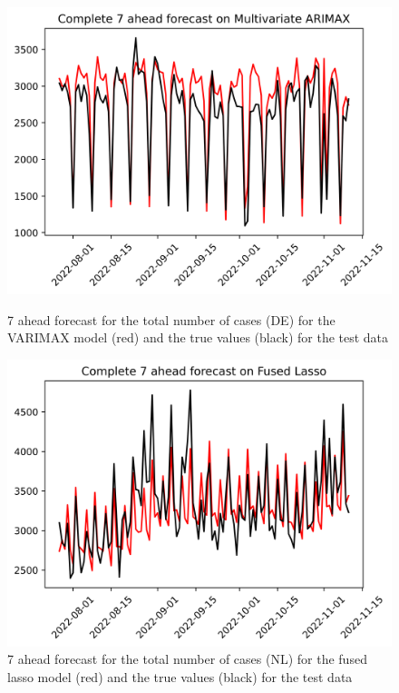 \begin{figure}

\begin{minipage}{.32\textwidth}
  \centering
  \includegraphics[width=\linewidth]{pics/7_ah/DE_Complete_7_ahead_Multivariate ARIMAX.png}
  \caption{7 ahead forecast for the total number of cases (DE) for the VARIMAX model (red) and the true values (black) for the test data}
  \label{fig:tot_cases_fc_7_VARIMAX_DE}
\end{minipage}
\begin{minipage}{.32\textwidth}
  \centering
  \includegraphics[width=\linewidth]{pics/7_ah/Complete_7_ahead_Fused Lasso.png}
  \caption{7 ahead forecast for the total number of cases (NL) for the fused lasso model (red) and the true values (black) for the test data}

\end{minipage}
\end{figure}
